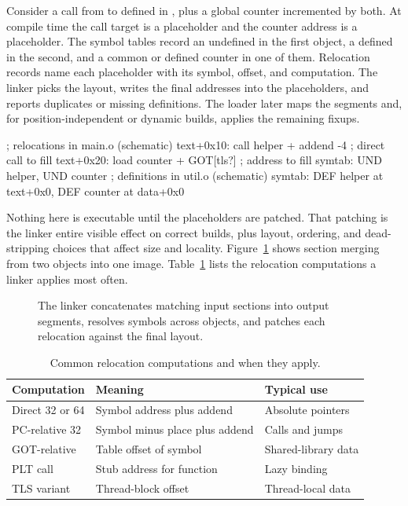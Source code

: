 Consider a call from  to  defined in , plus a global counter incremented by both.
At compile time the call target is a placeholder and the counter address is a placeholder.
The symbol tables record an undefined  in the first object, a defined  in the second, and a common or defined counter in one of them.
Relocation records name each placeholder with its symbol, offset, and computation.
The linker picks the layout, writes the final addresses into the placeholders, and reports duplicates or missing definitions.
The loader later maps the segments and, for position-independent or dynamic builds, applies the remaining fixups.
\begin{irlisting}
; relocations in main.o (schematic)
text+0x10: call helper + addend -4  ; direct call to fill
text+0x20: load counter + GOT[tls?] ; address to fill
symtab: UND helper, UND counter
; definitions in util.o (schematic)
symtab: DEF helper at text+0x0, DEF counter at data+0x0
\end{irlisting}
Nothing here is executable until the placeholders are patched.
That patching is the linker entire visible effect on correct builds, plus layout, ordering, and dead-stripping choices that affect size and locality.
Figure~\ref{fig:ch29-merge} shows section merging from two objects into one image.
Table~\ref{tab:ch29-reloc-kinds} lists the relocation computations a linker applies most often.

\begin{figure}[htbp]
\centering
{}
\caption{The linker concatenates matching input sections into output segments, resolves symbols across objects, and patches each relocation against the final layout.}
\label{fig:ch29-merge}
\end{figure}

\begin{table}[htbp]
\caption{Common relocation computations and when they apply.}
\label{tab:ch29-reloc-kinds}
\begin{tabular}{lll}
\toprule
Computation & Meaning & Typical use \\
\midrule
Direct 32 or 64 & Symbol address plus addend & Absolute pointers \\
PC-relative 32 & Symbol minus place plus addend & Calls and jumps \\
GOT-relative & Table offset of symbol & Shared-library data \\
PLT call & Stub address for function & Lazy binding \\
TLS variant & Thread-block offset & Thread-local data \\
\bottomrule
\end{tabular}
\end{table}

